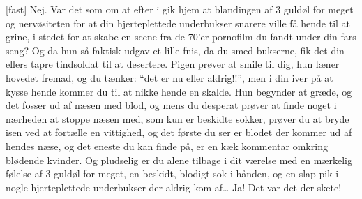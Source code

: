 \documentclass[a4paper,11pt]{article}
\begin{document}
\begin{sketch}
[fast] Nej.
 Var det som om at efter i gik hjem at blandingen af 3 guldøl for meget og nervøsiteten for at din hjerteplettede underbukser snarere ville få hende til at grine, i stedet for at skabe en scene fra de 70’er-pornofilm du fandt under din fars seng?
 Og da hun så faktisk udgav et lille fnis, da du smed bukserne, fik det din ellers tapre tindsoldat til at desertere.
 Pigen prøver at smile til dig, hun læner hovedet fremad, og du tænker: ``det er nu eller aldrig!!'', men i din iver på at kysse hende kommer du til at nikke hende en skalde.
 Hun begynder at græde, og det fosser ud af næsen med blod, og mens du desperat prøver at  finde noget i nærheden at stoppe næsen med, som kun er beskidte sokker, prøver du at bryde isen ved at fortælle en vittighed, og det første du ser er blodet der kommer ud af hendes næse, og det eneste du kan finde på, er en kæk kommentar omkring blødende kvinder.
 Og pludselig er du alene tilbage i dit værelse med en mærkelig følelse af 3 guldøl for meget, en beskidt, blodigt sok i hånden, og en slap pik i nogle hjerteplettede underbukser der aldrig kom af\ldots{}
 Ja!  Det var det der skete!


\end{sketch}
\end{document}
